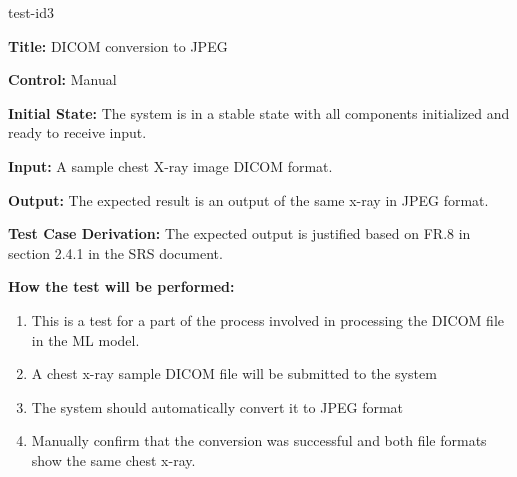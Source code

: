 \documentclass[12pt, titlepage]{article}
\begin{document}
\begin{itemize}
    \begin{item}
        test-id3
        \begin{mdframed}[linewidth=0.5mm]
            \textbf{Title:} DICOM conversion to JPEG \par
            \textbf{Control:} Manual \par
            \textbf{Initial State:} The system is in a stable state with all components initialized and ready to receive input. \par
            \textbf{Input:} A sample chest X-ray image DICOM format. \par
            \textbf{Output:} The expected result is an output of the same x-ray in JPEG format. \par
            \textbf{Test Case Derivation:} The expected output is justified based on FR.8 in section 2.4.1 in the SRS document. \par
            \textbf{How the test will be performed:}
            \begin{enumerate}[noitemsep]
                \item This is a test for a part of the process involved in processing the DICOM file in the ML model.
                \item A chest x-ray sample DICOM file will be submitted to the system
                \item The system should automatically convert it to JPEG format
                \item Manually confirm that the conversion was successful and both file formats show the same chest x-ray.
            \end{enumerate}
        \end{mdframed}
    \end{item}
\end{itemize}
\end{document}
